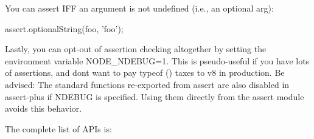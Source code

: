 You can assert I\+FF an argument is not {\ttfamily undefined} (i.\+e., an optional arg)\+:


\begin{DoxyCode}
assert.optionalString(foo, 'foo');
\end{DoxyCode}


Lastly, you can opt-\/out of assertion checking altogether by setting the environment variable {\ttfamily N\+O\+D\+E\+\_\+\+N\+D\+E\+B\+UG=1}. This is pseudo-\/useful if you have lots of assertions, and don\textquotesingle{}t want to pay {\ttfamily typeof ()} taxes to v8 in production. Be advised\+: The standard functions re-\/exported from {\ttfamily assert} are also disabled in assert-\/plus if N\+D\+E\+B\+UG is specified. Using them directly from the {\ttfamily assert} module avoids this behavior.

The complete list of A\+P\+Is is\+:


